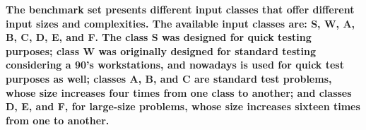 \documentclass[AMA,final,STIX1COL]{WileyNJD-v2}
\newcommand\new[1]{{\color{red}\textbf{#1}}}
\newcommand{\fbm}[1]{\textcolor{red}{\bfseries \ul{fbm: #1} }\vspace{0.2cm}}
\begin{document}
\new{The benchmark set presents different input classes that offer different input sizes and complexities.
The available input classes are: S, W, A, B, C, D, E, and F.
The class S was designed for quick testing purposes; class W was originally designed for standard testing considering a 90's workstations, and nowadays is used for quick test purposes as well; classes A, B, and C are standard test problems, whose size increases four times from one class to another; and classes D, E, and F, for large-size problems, whose size increases sixteen times from one to another.}


\end{document}
